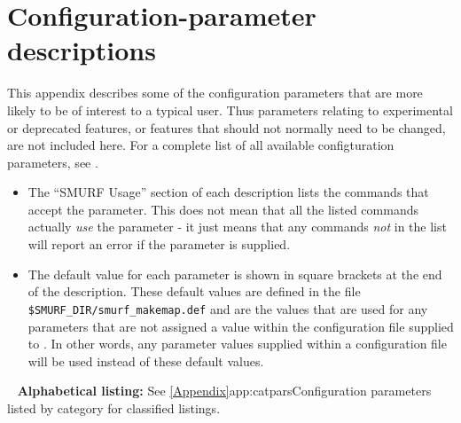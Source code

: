 \chapter{Configuration-parameter descriptions}
\label{app:parameters}

This appendix describes some of the \makemap configuration parameters
that are more likely to be of interest to a typical user. Thus parameters
relating to experimental or deprecated features, or features that should
not normally need to be changed, are not included here. For a complete list
of all available configturation parameters, see
.

\begin{itemize}
\item The ``SMURF Usage'' section of each description lists the \SMURF
commands that accept the parameter. This does not mean that all the
listed commands actually \emph{use} the parameter - it just means that
any commands \emph{not} in the list will report an error if the parameter
is supplied.
\item The default value for each parameter is shown in square brackets at
the end of the description. These default values are defined in the file
\texttt{\$SMURF\_DIR/smurf\_makemap.def} and are the values that are used
for any parameters that are not assigned a value within the configuration
file supplied to \makemap. In other words, any parameter values supplied
within a configuration file will be used instead of these default values.
\end{itemize}
\ifpdf
\else
~\newline
\textbf{\large Alphabetical listing:} \newline
See \cref{Appendix}{app:catpars}{Configuration parameters listed by
category} for classified listings.
\fi

\sstminitoc{}
\sstnomaintoc

\sstmaintoc

